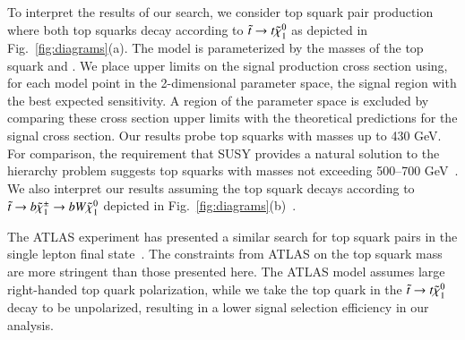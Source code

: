 

To interpret the results of our search, we consider top squark pair production where both top squarks decay according to 
$\tilde{t}\to t\tilde{\chi}_{1}^{0}$ as depicted in Fig.~\ref{fig:diagrams}(a).
The model is parameterized by the masses of the top squark and \lsp. We place upper limits on the signal
production cross section using, for each model point in the 2-dimensional parameter space, the signal region with the best expected
sensitivity. A region of the parameter space is excluded by comparing these cross section upper limits with the theoretical predictions 
for the signal cross section.
Our results probe top squarks with masses up to 430 GeV. For comparison, the requirement that SUSY
provides a natural solution to the hierarchy problem suggests top squarks with masses not exceeding 500--700 GeV~\cite{ref:naturalsusy}.
We also interpret our results assuming the top squark decays according to $\tilde{t}\to b\tilde{\chi}_{1}^{\pm}\to b W \tilde{\chi}_{1}^{0}$
depicted in Fig.~\ref{fig:diagrams}(b)~\cite{ref:stop}.

The ATLAS experiment has presented a similar search for top squark pairs in the single lepton final state~\cite{ref:atlasstop}.
The constraints from ATLAS on the top squark mass are more stringent than those presented here. The ATLAS model assumes large 
right-handed top quark polarization, while we take the top quark in the $\tilde{t}\to t\tilde{\chi}_{1}^{0}$ decay to be unpolarized, 
resulting in a lower signal selection efficiency in our analysis.

